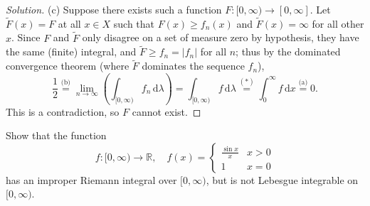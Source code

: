 \documentclass[10pt]{article}
\newcommand{\dd}{\,\mathrm{d}}
\providecommand{\half}{\frac{1}{2}}
\providecommand{\RR}{\mathbb R}
\newenvironment{soln}{\begin{proof}[Solution]}{\end{proof}}
\providecommand{\abs}[1]{\left|#1\right|}
\begin{document}
\begin{soln}
    (c) Suppose there exists such a function $F\colon[0,\infty)\to[0,\infty]$.
    Let $\widetilde F(x) = F$ at all $x\in X$ such that
    $F(x) \ge f_n(x)$ and $\widetilde F(x) = \infty$ for all other $x$.
    Since $F$ and $\widetilde F$ only disagree on
    a set of measure zero by hypothesis, they have the same (finite) integral,
    and $\widetilde F\ge f_n = \abs{f_n}$ for all $n$;
    thus by the dominated convergence theorem
    (where $\widetilde F$ dominates the sequence $f_n$),
    \begin{equation*}
	\half \overset{\text{(b)}}=
	\lim_{n\to\infty}\left(\int_{[0,\infty)} f_n\dd\lambda\right)
	= \int_{[0,\infty)} f\dd\lambda
	\overset{(\ast)}= \int_0^\infty f\dd x \overset{\text{(a)}}= 0.
    \end{equation*}
    This is a contradiction, so $F$ cannot exist.
\end{soln}

\pagebreak

\begin{problem}
    Show that the function
    \begin{equation*}
	f\colon[0,\infty)\to\RR,\quad
	f(x) = \begin{cases}
	    \frac{\sin x}x & x > 0\\
	    1 & x = 0
	\end{cases}
    \end{equation*}
    has an improper Riemann integral over $[0,\infty)$,
    but is not Lebesgue integrable on $[0,\infty)$.
\end{problem}
\end{document}
